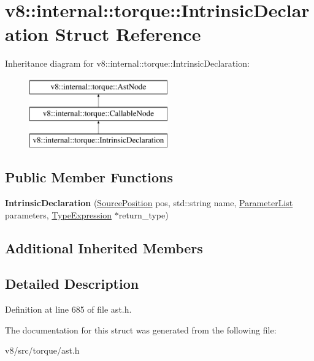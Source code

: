 \hypertarget{structv8_1_1internal_1_1torque_1_1IntrinsicDeclaration}{}\section{v8\+:\+:internal\+:\+:torque\+:\+:Intrinsic\+Declaration Struct Reference}
\label{structv8_1_1internal_1_1torque_1_1IntrinsicDeclaration}
Inheritance diagram for v8\+:\+:internal\+:\+:torque\+:\+:Intrinsic\+Declaration\+:\begin{figure}[H]
\begin{center}
\leavevmode
\includegraphics[height=3.000000cm]{structv8_1_1internal_1_1torque_1_1IntrinsicDeclaration}
\end{center}
\end{figure}
\subsection*{Public Member Functions}
\begin{DoxyCompactItemize}
\item 
\mbox{\label{structv8_1_1internal_1_1torque_1_1IntrinsicDeclaration_a4882427a28fa63a4bd9d254c228e76a8}} 
{\bfseries Intrinsic\+Declaration} (\mbox{\hyperlink{structv8_1_1internal_1_1torque_1_1SourcePosition}{Source\+Position}} pos, std\+::string name, \mbox{\hyperlink{structv8_1_1internal_1_1torque_1_1ParameterList}{Parameter\+List}} parameters, \mbox{\hyperlink{structv8_1_1internal_1_1torque_1_1TypeExpression}{Type\+Expression}} $\ast$return\+\_\+type)
\end{DoxyCompactItemize}
\subsection*{Additional Inherited Members}


\subsection{Detailed Description}


Definition at line 685 of file ast.\+h.



The documentation for this struct was generated from the following file\+:\begin{DoxyCompactItemize}
\item 
v8/src/torque/ast.\+h\end{DoxyCompactItemize}

